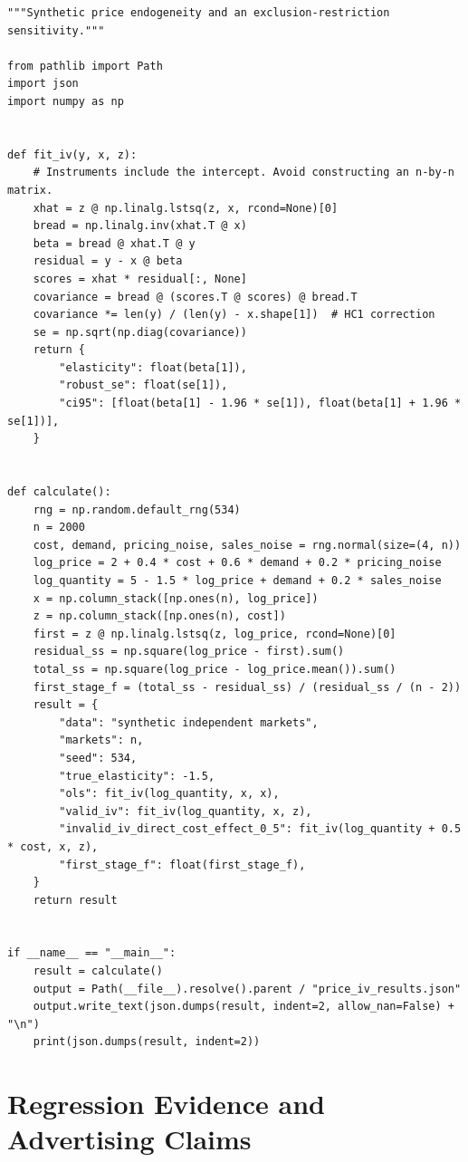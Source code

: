 \begin{Verbatim}[breaklines,breakanywhere,fontsize=\small]
"""Synthetic price endogeneity and an exclusion-restriction sensitivity."""

from pathlib import Path
import json
import numpy as np


def fit_iv(y, x, z):
    # Instruments include the intercept. Avoid constructing an n-by-n matrix.
    xhat = z @ np.linalg.lstsq(z, x, rcond=None)[0]
    bread = np.linalg.inv(xhat.T @ x)
    beta = bread @ xhat.T @ y
    residual = y - x @ beta
    scores = xhat * residual[:, None]
    covariance = bread @ (scores.T @ scores) @ bread.T
    covariance *= len(y) / (len(y) - x.shape[1])  # HC1 correction
    se = np.sqrt(np.diag(covariance))
    return {
        "elasticity": float(beta[1]),
        "robust_se": float(se[1]),
        "ci95": [float(beta[1] - 1.96 * se[1]), float(beta[1] + 1.96 * se[1])],
    }


def calculate():
    rng = np.random.default_rng(534)
    n = 2000
    cost, demand, pricing_noise, sales_noise = rng.normal(size=(4, n))
    log_price = 2 + 0.4 * cost + 0.6 * demand + 0.2 * pricing_noise
    log_quantity = 5 - 1.5 * log_price + demand + 0.2 * sales_noise
    x = np.column_stack([np.ones(n), log_price])
    z = np.column_stack([np.ones(n), cost])
    first = z @ np.linalg.lstsq(z, log_price, rcond=None)[0]
    residual_ss = np.square(log_price - first).sum()
    total_ss = np.square(log_price - log_price.mean()).sum()
    first_stage_f = (total_ss - residual_ss) / (residual_ss / (n - 2))
    result = {
        "data": "synthetic independent markets",
        "markets": n,
        "seed": 534,
        "true_elasticity": -1.5,
        "ols": fit_iv(log_quantity, x, x),
        "valid_iv": fit_iv(log_quantity, x, z),
        "invalid_iv_direct_cost_effect_0_5": fit_iv(log_quantity + 0.5 * cost, x, z),
        "first_stage_f": float(first_stage_f),
    }
    return result


if __name__ == "__main__":
    result = calculate()
    output = Path(__file__).resolve().parent / "price_iv_results.json"
    output.write_text(json.dumps(result, indent=2, allow_nan=False) + "\n")
    print(json.dumps(result, indent=2))
\end{Verbatim}

\hypertarget{M03-regression-evidence-and-advertising-claims}{%
\section{Regression Evidence and Advertising
Claims}\label{M03-regression-evidence-and-advertising-claims}}

